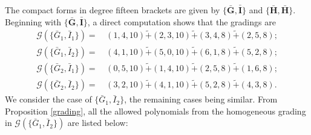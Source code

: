 \documentclass[10pt]{amsart}
\theoremstyle{definition}
\theoremstyle{corollary}
\theoremstyle{remark}
\theoremstyle{conclusion}
\begin{document}
The compact forms in degree fifteen brackets are given by $\{\bar{\textbf{G}},\bar{\textbf{I}}\}$ and $\{\bar{\textbf{H}},\bar{\textbf{H}}\}$. 
 Beginning with $\{\bar{\textbf{G}},\bar{\textbf{I}}\}$, a direct computation shows that the gradings are  
\begin{align}
      \mathcal{G} \left(\{\bar{G}_1,\bar{I}_1\}\right) =& \, (1,4,10) \tilde{+} (2,3,10) \tilde{+}(3,4,8) \tilde{+} (2,5,8)  ; \nonumber\\
    \mathcal{G} \left(\{\bar{G}_1,\bar{I}_2\}\right) =& \, (4,1,10) \tilde{+} (5,0,10) \tilde{+}(6,1,8) \tilde{+} (5,2,8)  ; \nonumber \\
    \mathcal{G} \left(\{\bar{G}_2,\bar{I}_1\}\right) =& \,  (0,5,10) \tilde{+} (1,4,10) \tilde{+}(2,5,8) \tilde{+} (1,6,8)   ; \nonumber \\
      \mathcal{G} \left(\{\bar{G}_2,\bar{I}_2\}\right) =& \, (3,2,10) \tilde{+} (4,1,10) \tilde{+}(5,2,8) \tilde{+} (4,3,8).
\end{align} 
 We consider the case of $\{\bar{G}_1,\bar{I}_2\}$, the remaining cases being similar. From Proposition \ref{grading}, all the allowed polynomials from the homogeneous grading in $\mathcal{G} \left(\{\bar{G}_1,\bar{I}_2\}\right)$ are listed below:
\end{document}
